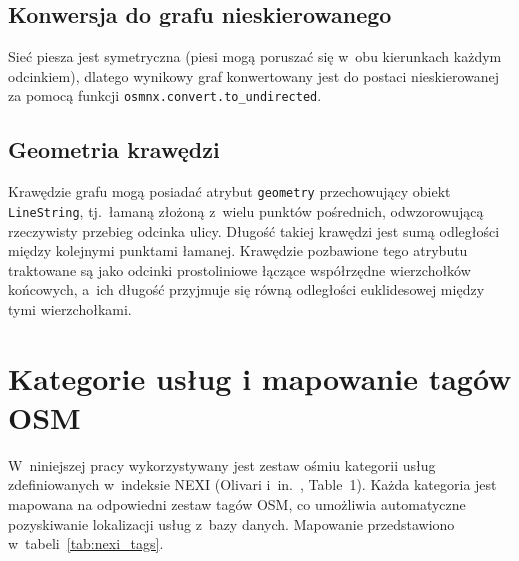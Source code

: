 \subsection{Konwersja do grafu nieskierowanego}

Sieć piesza jest symetryczna (piesi mogą poruszać się w~obu kierunkach każdym odcinkiem),
dlatego wynikowy graf konwertowany jest do postaci nieskierowanej za pomocą funkcji
\texttt{osmnx.convert.to\_undirected}.

\subsection{Geometria krawędzi}

Krawędzie grafu mogą posiadać atrybut \texttt{geometry} przechowujący obiekt \texttt{LineString},
tj.\ łamaną złożoną z~wielu punktów pośrednich, odwzorowującą rzeczywisty przebieg odcinka ulicy.
Długość takiej krawędzi jest sumą odległości między kolejnymi punktami łamanej.
Krawędzie pozbawione tego atrybutu traktowane są jako odcinki prostoliniowe łączące współrzędne
wierzchołków końcowych, a~ich długość przyjmuje się równą odległości euklidesowej między
tymi wierzchołkami.

\section{Kategorie usług i mapowanie tagów OSM}
\label{sec:dane:uslugi}

W~niniejszej pracy wykorzystywany jest zestaw ośmiu kategorii usług zdefiniowanych
w~indeksie NEXI (Olivari i~in.\ \cite{olivari2023presenting}, Table~1).
Każda kategoria jest mapowana na odpowiedni zestaw tagów OSM,
co umożliwia automatyczne pozyskiwanie lokalizacji usług z~bazy danych.
Mapowanie przedstawiono w~tabeli~\ref{tab:nexi_tags}.

